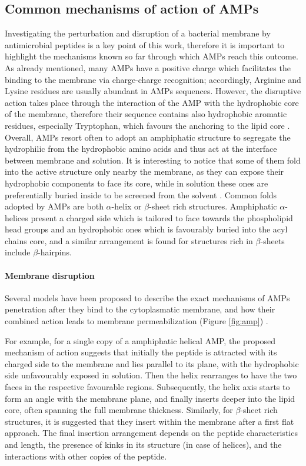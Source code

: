 \subsection{Common mechanisms of action of AMPs} \label{AMP_mechs}
Investigating the perturbation and disruption of a bacterial membrane by antimicrobial peptides is a key point of this work, therefore it is important to highlight the mechanisms known so far through which AMPs reach this outcome.
%
As already mentioned, many AMPs have a positive charge which facilitates the binding to the membrane via charge-charge recognition; accordingly, Arginine and Lysine residues are usually abundant in AMPs sequences. However, the disruptive action takes place through the interaction of the AMP with the hydrophobic core of the membrane, therefore their sequence contains also hydrophobic aromatic residues, especially Tryptophan, which favours the anchoring to the lipid core \cite{Chan2006}.
%
Overall, AMPs resort often to adopt an amphiphatic structure to segregate the hydrophilic from the hydrophobic amino acids and thus act at the interface between membrane and solution. It is interesting to notice that some of them fold into the active structure only nearby the membrane, as they can expose their hydrophobic components to face its core, while in solution these ones are preferentially buried inside to be screened from the solvent \cite{Nguyen2011}.
%
Common folds adopted by AMPs are both $\alpha$-helix or $\beta$-sheet rich structures. Amphiphatic $\alpha$-helices present a charged side which is tailored to face towards the phospholipid head groups and an hydrophobic ones which is favourably buried into the acyl chains core,
%
and a similar arrangement is found for structures rich in $\beta$-sheets include $\beta$-hairpins.


\paragraph{Membrane disruption} Several models have been proposed to describe the exact mechanisms of AMPs penetration after they bind to the cytoplasmatic membrane, and how their combined action leads to membrane permeabilization (Figure \ref{fig:amp}) \cite{Brogden2005,Nguyen2011}.

For example, for a single copy of a amphiphatic helical AMP, the proposed mechanism of action suggests that initially the peptide is attracted with its charged side to the membrane and lies parallel to its plane, with the hydrophobic side unfavourably exposed in solution. Then the helix rearranges to have the two faces in the respective favourable regions. Subsequently, the helix axis starts to form an angle with the membrane plane, and finally inserts deeper into the lipid core, often spanning the full membrane thickness.
%
Similarly, for $\beta$-sheet rich structures, it is suggested that they insert within the membrane after a first flat approach.
%
The final insertion arrangement depends on the peptide characteristics and length, the presence of kinks in its structure (in case of helices), and the interactions with other copies of the peptide.

